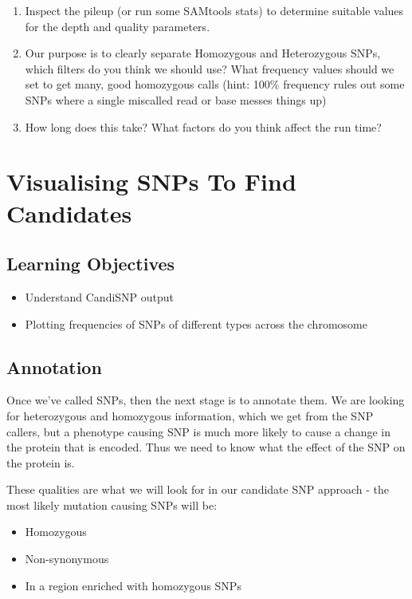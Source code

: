 \documentclass[12pt,]{book}
\providecommand{\tightlist}{%
  \setlength{\itemsep}{0pt}\setlength{\parskip}{0pt}}
\begin{document}
\begin{enumerate}
\def\labelenumi{\arabic{enumi}.}
\tightlist
\item
  Inspect the pileup (or run some SAMtools stats) to determine suitable
  values for the depth and quality parameters.
\item
  Our purpose is to clearly separate Homozygous and Heterozygous SNPs,
  which filters do you think we should use? What frequency values should
  we set to get many, good homozygous calls (hint: 100\% frequency rules
  out some SNPs where a single miscalled read or base messes things up)
\item
  How long does this take? What factors do you think affect the run
  time?
\end{enumerate}

\chapter{Visualising SNPs To Find
Candidates}\label{visualising-snps-to-find-candidates}

\section{Learning Objectives}\label{learning-objectives-4}

\begin{itemize}
\tightlist
\item
  Understand CandiSNP output
\item
  Plotting frequencies of SNPs of different types across the chromosome
\end{itemize}

\section{Annotation}\label{annotation}

Once we've called SNPs, then the next stage is to annotate them. We are
looking for heterozygous and homozygous information, which we get from
the SNP callers, but a phenotype causing SNP is much more likely to
cause a change in the protein that is encoded. Thus we need to know what
the effect of the SNP on the protein is.

These qualities are what we will look for in our candidate SNP approach
- the most likely mutation causing SNPs will be:

\begin{itemize}
\tightlist
\item
  Homozygous
\item
  Non-synonymous
\item
  In a region enriched with homozygous SNPs
\end{itemize}
\end{document}
